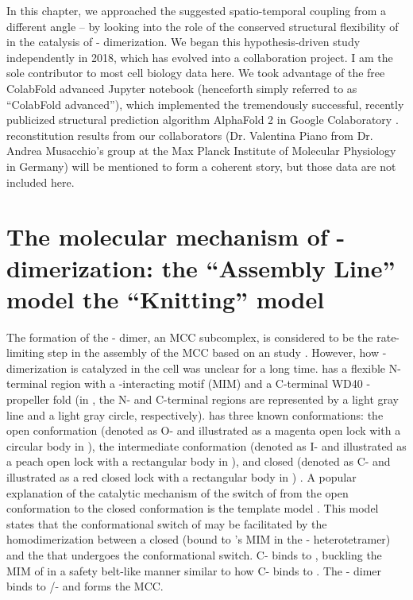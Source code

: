 In this chapter, we approached the suggested spatio-temporal coupling from a different angle -- by looking into the role of the conserved structural flexibility of  in the catalysis of - dimerization. We began this hypothesis-driven study independently in 2018, which has evolved into a collaboration project. I am the sole contributor to most cell biology data here. We took advantage of the free ColabFold advanced Jupyter notebook (henceforth simply referred to as ``ColabFold advanced''), which implemented the tremendously successful, recently publicized structural prediction algorithm AlphaFold 2 in Google Colaboratory \cite{ColabFold, AlphaFold}.  reconstitution results from our collaborators (Dr. Valentina Piano from Dr. Andrea Musacchio's group at the Max Planck Institute of Molecular Physiology in Germany) will be mentioned to form a coherent story, but those data are not included here. %

\section{The molecular mechanism of - dimerization: the ``Assembly Line'' model  the ``Knitting'' model}
\label{TwoModels}

The formation of the - dimer, an MCC subcomplex, is considered to be the rate-limiting step in the assembly of the MCC based on an  study \cite{Faesen2017}. However, how - dimerization is catalyzed in the cell was unclear for a long time.  has a flexible N-terminal region with a -interacting motif (MIM) and a C-terminal WD40 \textbeta{}-propeller fold \cite{hCDC20Structure} (in , the N- and C-terminal regions are represented by a light gray line and a light gray circle, respectively).  has three known conformations: the open conformation (denoted as O- and illustrated as a magenta open lock with a circular body in ), the intermediate conformation (denoted as I- and illustrated as a peach open lock with a rectangular body in ), and closed (denoted as C- and illustrated as a red closed lock with a rectangular body in ) \cite{I-MAD2}. A popular explanation of the catalytic mechanism of the switch of  from the open conformation to the closed conformation is the template model \cite{TemplateModel}. This model states that the conformational switch of  may be facilitated by the homodimerization between a closed  (bound to 's MIM in the - heterotetramer) and the  that undergoes the conformational switch. C- binds to , buckling the MIM of  in a safety belt-like manner similar to how C- binds to  \cite{Structure1GO4, SpMCC}. The - dimer binds to /- and forms the MCC.

